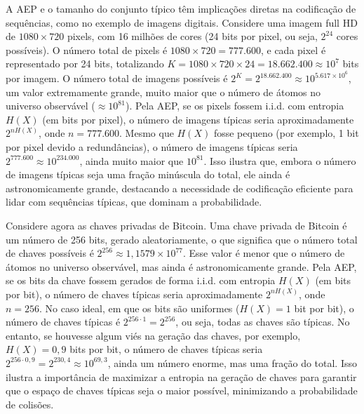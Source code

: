 A AEP e o tamanho do conjunto típico têm implicações diretas na codificação de
sequências, como no exemplo de imagens digitais. Considere uma imagem full HD
de $1080 \times 720$ pixels, com 16 milhões de cores (24 bits por pixel, ou
seja, $2^{24}$ cores possíveis). O número total de pixels é $1080 \times
720 = 777.600$, e cada pixel é representado por 24 bits, totalizando 
$K = 1080 \times 720 \times 24 = 18.662.400 \approx 10^7$ bits por imagem. O
número total de imagens possíveis é $2^K = 2^{18.662.400} \approx 10^{5.617 \times 10^6}$, 
um valor extremamente grande, muito maior que o número de
átomos no universo observável ($\approx 10^{81}$). Pela AEP, se os pixels
fossem i.i.d. com entropia $H(X)$ (em bits por pixel), o número de imagens
típicas seria aproximadamente $2^{nH(X)}$, onde $n = 777.600$. Mesmo
que $H(X)$ fosse pequeno (por exemplo, 1 bit por pixel devido a
redundâncias), o número de imagens típicas seria $2^{777.600} \approx 10^{234.000}$, 
ainda muito maior que $10^{81}$. Isso ilustra que, embora
o número de imagens típicas seja uma fração minúscula do total, ele ainda é
astronomicamente grande, destacando a necessidade de codificação eficiente para
lidar com sequências típicas, que dominam a probabilidade.

Considere agora as chaves privadas de Bitcoin. Uma
chave privada de Bitcoin é um número de 256 bits, gerado aleatoriamente, o que
significa que o número total de chaves possíveis é $2^{256} \approx 1,1579 \times 10^{77}$. 
Esse valor é menor que o número de átomos no universo observável, mas ainda é astronomicamente grande. 
Pela AEP, se os bits da chave fossem gerados de forma i.i.d. com entropia $H(X)$
(em bits por bit), o número de chaves típicas seria aproximadamente $2^{nH(X)}$, 
onde $n = 256$. No caso ideal, em que os bits são uniformes
($H(X) = 1$ bit por bit), o número de chaves típicas é $2^{256 \cdot 1} = 2^{256}$,
ou seja, todas as chaves são típicas. No entanto, se houvesse algum
viés na geração das chaves, por exemplo, $H(X) = 0,9$ bits por bit, o
número de chaves típicas seria $2^{256 \cdot 0,9} = 2^{230,4} \approx 10^{69,3}$, 
ainda um número enorme, mas uma fração do total. Isso ilustra a
importância de maximizar a entropia na geração de chaves para garantir que o
espaço de chaves típicas seja o maior possível, minimizando a probabilidade de
colisões.

